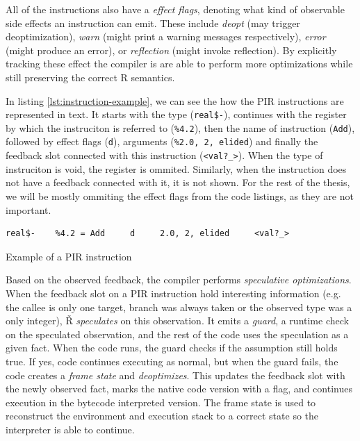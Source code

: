 All of the instructions also have a \textit{effect flags}, denoting what kind of observable side effects an instruction can emit. These include \textit{deopt} (may trigger deoptimization), \textit{warn} (might print a warning messages respectively), \textit{error} (might produce an error), or \textit{reflection} (might invoke reflection). By explicitly tracking these effect the compiler is are able to perform more optimizations while still preserving the correct R semantics.

In listing \ref{lst:instruction-example}, we can see the how the PIR instructions are represented in text. It starts with the type (\texttt{real\$-}), continues with the register by which the instruciton is referred to (\texttt{\%4.2}), then the name of instruction (\texttt{Add}), followed by effect flags (\texttt{d}), arguments (\texttt{\%2.0, 2, elided}) and finally the feedback slot connected with this instruction (\texttt{<val?\_>}). When the type of instruciton is void, the register is ommited. Similarly, when the instruction does not have a feedback connected with it, it is not shown. For the rest of the thesis, we will be mostly ommiting the effect flags from the code listings, as they are not important.

\begin{listing}[H]
	\begin{verbatim}
real$-    %4.2 = Add     d     2.0, 2, elided     <val?_>
  \end{verbatim}
	\caption{Example of a PIR instruction}\label{lst:instruction-example}
\end{listing}

Based on the observed feedback, the compiler performs \textit{speculative optimizations}. When the feedback slot on a PIR instruction hold interesting information (e.g. the callee is only one target, branch was always taken or the observed type was a only integer), Ř \textit{speculates} on this observation. It emits a \textit{guard}, a runtime check on the speculated observation, and the rest of the code uses the speculation as a given fact. When the code runs, the guard checks if the assumption still holds true. If yes, code continues executing as normal, but when the guard fails, the code creates a \textit{frame state} and \textit{deoptimizes}. This updates the feedback slot with the newly observed fact, marks the native code version with a flag, and continues execution in the bytecode interpreted version. The frame state is used to reconstruct the environment and execution stack to a correct state so the interpreter is able to continue. 

